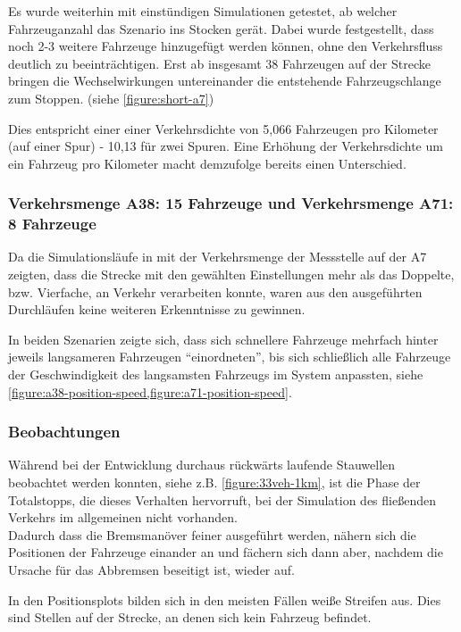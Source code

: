 Es wurde weiterhin mit einstündigen Simulationen getestet, ab welcher Fahrzeuganzahl das Szenario ins Stocken gerät.
Dabei wurde festgestellt, dass noch 2-3 weitere Fahrzeuge hinzugefügt werden können, ohne den Verkehrsfluss deutlich zu beeinträchtigen.
Erst ab insgesamt 38 Fahrzeugen auf der Strecke bringen die Wechselwirkungen untereinander die entstehende Fahrzeugschlange zum Stoppen. (siehe \cref{figure:short-a7})

Dies entspricht einer einer Verkehrsdichte von 5,066 Fahrzeugen pro Kilometer (auf einer Spur) - 10,13 für zwei Spuren.
Eine Erhöhung der Verkehrsdichte um ein Fahrzeug pro Kilometer macht demzufolge bereits einen Unterschied.



\subsubsection{Verkehrsmenge A38: 15 Fahrzeuge und Verkehrsmenge A71: 8 Fahrzeuge}
\label{sec:szenario-a38-a71}

Da die Simulationsläufe in mit der Verkehrsmenge der Messstelle auf der A7 zeigten, dass die Strecke mit den gewählten Einstellungen mehr als das Doppelte, bzw. Vierfache, an Verkehr verarbeiten konnte, waren aus den ausgeführten Durchläufen keine weiteren Erkenntnisse zu gewinnen.

In beiden Szenarien zeigte sich, dass sich schnellere Fahrzeuge mehrfach hinter jeweils langsameren Fahrzeugen \enquote{einordneten}, bis sich schließlich alle Fahrzeuge der Geschwindigkeit des langsamsten Fahrzeugs im System anpassten, siehe \cref{figure:a38-position-speed,figure:a71-position-speed}.



\subsubsection{Beobachtungen}

Während bei der Entwicklung durchaus rückwärts laufende Stauwellen beobachtet werden konnten, siehe z.B. \cref{figure:33veh-1km}, ist die Phase der Totalstopps, die dieses Verhalten hervorruft, bei der Simulation des fließenden Verkehrs im allgemeinen nicht vorhanden.
\\
Dadurch dass die Bremsmanöver feiner ausgeführt werden, nähern sich die Positionen der Fahrzeuge einander an und fächern sich dann aber, nachdem die Ursache für das Abbremsen beseitigt ist, wieder auf.

In den Positionsplots bilden sich in den meisten Fällen weiße Streifen aus. Dies sind Stellen auf der Strecke, an denen sich kein Fahrzeug befindet.



